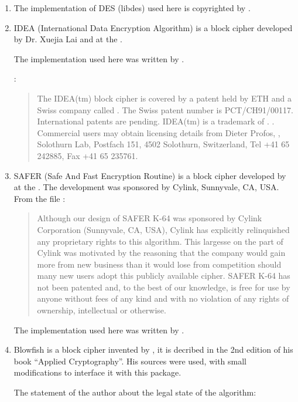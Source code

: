 \documentclass {report}
\begin{document}
\begin {enumerate}
\item	The implementation of DES (libdes) used here is copyrighted by
	\eay.

\item	IDEA (International Data Encryption Algorithm) is a block
	cipher developed  by  Dr. Xuejia Lai  and \massey{} at the \sfit{}.

	The implementation used here was written by \demoliner.

	:
	\begin {quotation}
		The IDEA(tm) block cipher is covered by a patent held
		by ETH and a Swiss company called \ascom{}.  The
		Swiss patent number is PCT/CH91/00117.  International
		patents are pending. IDEA(tm) is a trademark of
		\ascom{}.  .  Commercial users may obtain
		licensing details from Dieter Profos, \ascom{},
		Solothurn Lab, Postfach 151, 4502 Solothurn,
		Switzerland, Tel +41 65 242885, Fax +41 65 235761. 
	\end {quotation}

\item	SAFER (Safe And Fast Encryption Routine) is a block cipher
	developed by \massey{} at the \sfit{}. The development was
	sponsored by Cylink, Sunnyvale, CA, USA. From the file
	:

	\begin {quotation}
		Although our design of SAFER K-64 was sponsored  by
		Cylink Corporation  (Sunnyvale,  CA,  USA),  Cylink
		has explicitly relinquished any proprietary rights to
		this algorithm.  This largesse  on the part of Cylink
		was motivated by the reasoning that the company would
		gain more from new business  than it  would  lose from
		competition should many new users adopt this publicly
		available cipher.  SAFER  K-64  has  not  been
		patented  and, to the best of our knowledge, is free
		for use by anyone without fees of any kind and with no
		violation  of any rights of ownership, intellectual or
		otherwise.
	\end {quotation}

	The implementation used here was written by \demoliner.


\item	Blowfish is a block cipher invented by \schneier{}, it is
	decribed in the 2nd edition of his book ``Applied
	Cryptography''. His sources were used, with small
	modifications to interface it with this package.

	The statement of the author about the legal state of the
	algorithm:


\end{enumerate}
\end{document}
